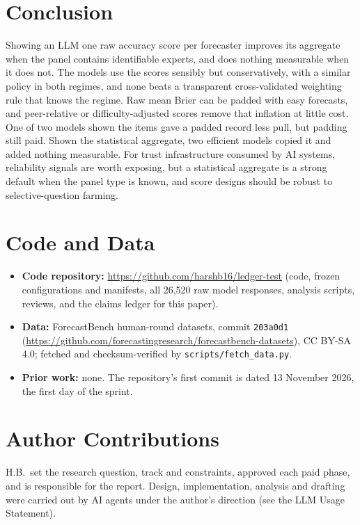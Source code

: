 \documentclass[11pt,letterpaper]{article}
\begin{document}
\section{Conclusion}
Showing an LLM one raw accuracy score per forecaster improves its aggregate when the panel contains identifiable
experts, and does nothing measurable when it does not. The models use the scores sensibly but conservatively, with a
similar policy in both regimes, and none beats a transparent cross-validated weighting rule that knows the regime. Raw
mean Brier can be padded with easy forecasts, and peer-relative or difficulty-adjusted scores remove that inflation at
little cost. One of two models shown the items gave a padded record less pull, but padding still paid. Shown the statistical
aggregate, two efficient models copied it and added nothing measurable. For trust
infrastructure consumed by AI systems, reliability signals are worth exposing, but a statistical
aggregate is a strong default when the panel type is known, and score designs should be robust to selective-question farming.

\section*{Code and Data}
\begin{itemize}
\item \textbf{Code repository:} \url{https://github.com/harshb16/ledger-test} (code, frozen configurations and
  manifests, all 26,520 raw model responses, analysis scripts, reviews, and the claims ledger for this paper).
\item \textbf{Data:} ForecastBench human-round datasets, commit \texttt{203a0d1}
  (\url{https://github.com/forecastingresearch/forecastbench-datasets}), CC BY-SA 4.0; fetched and checksum-verified
  by \texttt{scripts/fetch\_data.py}.
\item \textbf{Prior work:} none. The repository's first commit is dated 13 November 2026, the first day of the sprint.
\end{itemize}

\section*{Author Contributions}
H.B.\ set the research question, track and constraints, approved each paid phase, and is responsible for the
report. Design, implementation, analysis and drafting were carried out by AI agents under the author's direction (see the LLM
Usage Statement).
\end{document}
